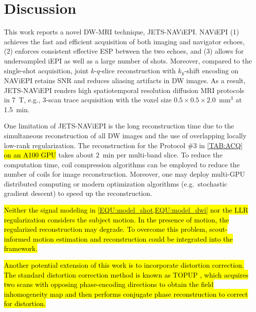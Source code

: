 \documentclass[preprint,12pt,authoryear,review]{elsarticle}
\begin{document}
    \clearpage

    \section{Discussion}
    \label{SEC:Disc}

    This work reports a novel DW-MRI technique, JETS-NAViEPI.
    NAViEPI (1) achieves the fast and efficient acquisition of
    both imaging and navigator echoes,
    (2) enforces consistent effective ESP between the two echoes, and
    (3) allows for undersampled iEPI as well as a large number of shots.
    Moreover, compared to the single-shot acquisition,
    joint $k$-$q$-slice reconstruction
    with $k_y$-shift encoding on NAViEPI
    retains SNR and reduces aliasing artifacts in DW images.
    As a result, JETS-NAViEPI renders high spatiotemporal resolution
    diffusion MRI protocols in \SI{7}{\tesla},
    e.g., 3-scan trace acquisition with the voxel size
    $0.5\times0.5\times2.0$~mm$^3$ at \SI{1.5}{\minute}.

    One limitation of JETS-NAViEPI is the long reconstruction time
    due to the simultaneous reconstruction of all DW images and
    the use of overlapping locally low-rank regularization.
    The reconstruction for the Protocol \#3 in \cref{TAB:ACQ}
    \hl{on an A100 GPU} takes about \SI{2}{\minute} per multi-band slice.
    To reduce the computation time, coil compression algorithms
    \citep{buehrer_2007_scc,huang_2008_scc}
    can be employed to reduce the number of coils for image reconstruction.
    Moreover, one may deploy multi-GPU distributed computing
    or modern optimization algorithms
    (e.g.~stochastic gradient descent) \citep{ong_2020_extreme}
    to speed up the reconstruction.

    \hl{Neither the signal modeling in
    \mbox{\cref{EQU:model_shot,EQU:model_dwi}}
    nor the LLR regularization considers the subject motion.
    In the presence of motion, the regularized reconstruction may degrade.
    To overcome this problem, scout-informed motion estimation
    and reconstruction \mbox{\citep{polak_2022_samer}}
    could be integrated into the framework.}

    \hl{Another potential extension of this work is
    to incorporate distortion correction.
    The standard distortion correction method is
    known as TOPUP \mbox{\citep{andersson_2003_topup}},
    which acquires two scans
    with opposing phase-encoding directions to
    obtain the field inhomogeneity map and
    then performs conjugate phase reconstruction
    to correct for distortion.}
\end{document}
